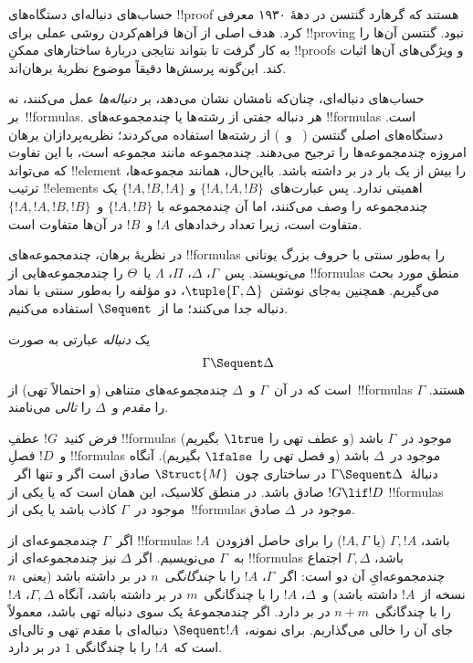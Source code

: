 \documentclass[../../../include/open-logic-section]{subfiles}
\begin{document}


حساب‌های دنباله‌ای دستگاه‌های !!{proof} هستند که گرهارد گنتسن در دههٔ
۱۹۳۰ معرفی کرد. هدف اصلی از آن‌ها فراهم‌کردن روشی عملی برای !!{proving}
نبود. گنتسن آن‌ها را به کار گرفت تا بتواند نتایجی دربارهٔ ساختارهای ممکنِ
!!{proof}s و ویژگی‌های آن‌ها اثبات کند. این‌گونه پرسش‌ها دقیقاً موضوع
نظریهٔ برهان‌اند.

حساب‌های دنباله‌ای، چنان‌که نامشان نشان می‌دهد، بر \emph{دنباله‌ها}
عمل می‌کنند، نه بر~!!{formula}s. هر دنباله جفتی از رشته‌ها یا چندمجموعه‌های
!!{formula}s است. دستگاه‌های اصلی گنتسن (~ و~) از
رشته‌ها استفاده می‌کردند؛ نظریه‌پردازان برهان امروزه چندمجموعه‌ها را ترجیح
می‌دهند. چندمجموعه مانند مجموعه است، با این تفاوت که می‌تواند !!{element}
را بیش از یک بار در بر داشته باشد. بااین‌حال، همانند مجموعه‌ها، ترتیب
!!{element}s اهمیتی ندارد. پس عبارت‌های~$\{!A, !A, !B\}$ و
$\{!A, !B, !A\}$ یک چندمجموعه را وصف می‌کنند، اما آن چندمجموعه با
$\{!A, !B\}$ و~$\{!A, !A, !B, !B\}$ متفاوت است، زیرا تعداد رخدادهای
$!A$ و~$!B$ در آن‌ها متفاوت است.

در نظریهٔ برهان، چندمجموعه‌های !!{formula}s را به‌طور سنتی با حروف بزرگ
یونانی می‌نویسند. پس~$\Gamma$، $\Delta$، $\Pi$، $\Lambda$ یا~$\Theta$
را چندمجموعه‌هایی از !!{formula}s منطق مورد بحث می‌گیریم. همچنین به‌جای
نوشتن~$\tuple{\Gamma, \Delta}$، دو مؤلفه را به‌طور سنتی با نماد دنباله
جدا می‌کنند؛ ما از~$\Sequent$ استفاده می‌کنیم.

\begin{defn}[دنباله]
یک \emph{دنباله} عبارتی به صورت
\[
\Gamma \Sequent \Delta
\]
است که در آن~$\Gamma$ و~$\Delta$ چندمجموعه‌های متناهی (و احتمالاً تهی)
از~!!{formula}s هستند. $\Gamma$ را \emph{مقدم} و~$\Delta$ را
\emph{تالی} می‌نامند.
\end{defn}

فرض کنید~$!G$ عطفِ !!{formula}s موجود در~$\Gamma$ باشد (و عطف تهی را
$\ltrue$ بگیریم) و~$!D$ فصلِ !!{formula}s موجود در~$\Delta$ باشد (و فصل
تهی را~$\lfalse$ بگیریم). آنگاه دنبالهٔ~$\Gamma \Sequent \Delta$ در
ساختاری چون~$\Struct{M}$ صادق است اگر و تنها اگر~$!G \lif !D$
صادق باشد. در منطق کلاسیک، این همان است که یا یکی از !!{formula}s موجود
در~$\Gamma$ کاذب باشد یا یکی از~!!{formula}s موجود در~$\Delta$ صادق.

اگر~$\Gamma$ چندمجموعه‌ای از !!{formula}s باشد، $\Gamma, !A$ (یا
$!A, \Gamma$) را برای حاصل افزودن~$!A$ به~$\Gamma$ می‌نویسیم. اگر
$\Delta$ نیز چندمجموعه‌ای از !!{formula}s باشد، $\Gamma, \Delta$ اجتماع
چندمجموعه‌ایِ آن دو است: اگر~$\Gamma$، $!A$ را با
\emph{چندگانگی}~$n$ در بر داشته باشد (یعنی~$n$ نسخه از~$!A$ داشته
باشد) و~$\Delta$، $!A$ را با چندگانگی~$m$ در بر داشته باشد، آنگاه
$\Gamma, \Delta$، $!A$ را با چندگانگی~$n+m$ در بر دارد. اگر چندمجموعهٔ
یک سوی دنباله تهی باشد، معمولاً جای آن را خالی می‌گذاریم. برای نمونه،
$\Sequent !A$ دنباله‌ای با مقدم تهی و تالی‌ای است که~$!A$ را با چندگانگی
$1$ در بر دارد.
\end{document}
